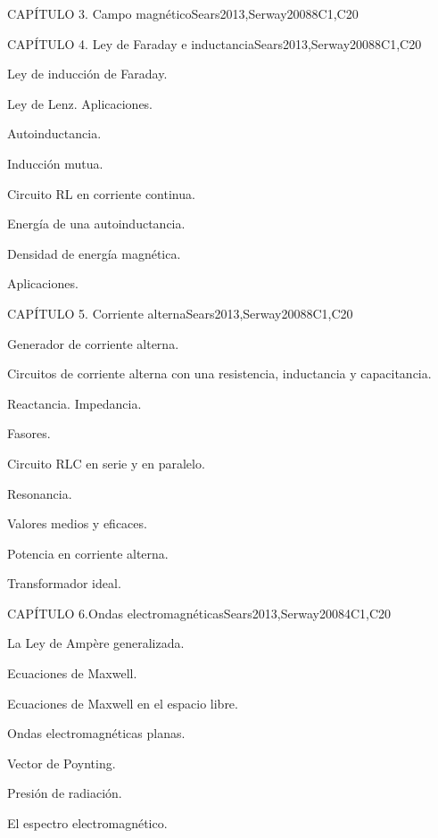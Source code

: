 \begin{syllabus}
\begin{unit}{CAPÍTULO 3. Campo magnético}{}{Sears2013,Serway2008}{8}{C1,C20}
\end{unit}

\begin{unit}{CAPÍTULO 4. Ley de Faraday e inductancia}{}{Sears2013,Serway2008}{8}{C1,C20}
\begin{topics}
      \item Ley de inducción de Faraday.
      \item Ley de Lenz. Aplicaciones.
      \item Autoinductancia.
      \item Inducción mutua.
      \item Circuito RL en corriente continua.
      \item Energía de una autoinductancia.
      \item Densidad de energía magnética.
      \item Aplicaciones.
   \end{topics}

\end{unit}

\begin{unit}{CAPÍTULO 5. Corriente alterna}{}{Sears2013,Serway2008}{8}{C1,C20}
\begin{topics}
	\item Generador de corriente alterna.
	\item Circuitos de corriente alterna con una resistencia, inductancia y capacitancia.
	\item Reactancia. Impedancia.
	\item Fasores.
	\item Circuito RLC en serie y en paralelo.
           \item Resonancia.
           \item Valores medios y eficaces.
           \item Potencia en corriente alterna.
           \item Transformador ideal.
   \end{topics}

\end{unit}

\begin{unit}{CAPÍTULO 6.Ondas electromagnéticas}{}{Sears2013,Serway2008}{4}{C1,C20}
   \begin{topics}
	\item La Ley de Ampère generalizada.
	\item Ecuaciones de Maxwell.
	\item Ecuaciones de Maxwell en el espacio libre.
	\item Ondas electromagnéticas planas.
	\item Vector de Poynting.
	\item Presión de radiación.
	\item El espectro electromagnético.
   \end{topics}
\end{unit}



\begin{coursebibliography}
\end{coursebibliography}

\end{syllabus}
